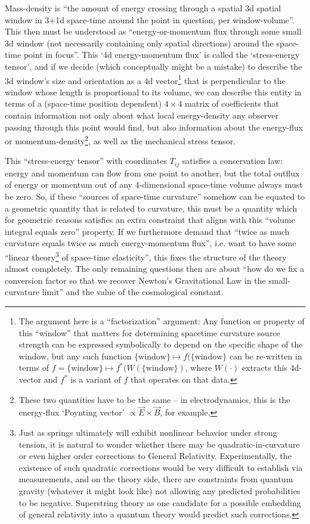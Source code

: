\documentclass[twocolumn]{article}
\begin{document}
Mass-density is ``the amount of energy crossing through a spatial 3d
spatial window in 3+1d space-time around the point in question, per
window-volume''. This then must be understood as ``energy-or-momentum
flux through some small 3d window (not necessarily containing only
spatial directions) around the space-time point in focus''. This `4d
energy-momentum flux' is called the `stress-energy tensor', and if we
decide (which conceptually might be a mistake) to describe the 3d
window's size and orientation as a 4d vector\footnote{The argument
here is a ``factorization'' argument: Any function or property of this
``window'' that matters for determining spacetime curvature source
strength can be expressed symbolically to depend on the specific shape
of the window, but any such function $\{\text{window}\}\mapsto
f(\{\text{window}\}$ can be re-written in terms of $f
= \{\text{window}\}\mapsto f^*(W(\{\text{window}\})$, where $W(\cdot)$
extracts this 4d-vector and $f^*$ is a variant of $f$ that operates on
that data.}
that is perpendicular to the window whose
length is proportional to its volume, we can describe this entity in
terms of a (space-time position dependent) $4\times 4$ matrix of
coefficients that contain information not only about what local
energy-density any observer passing through this point would find, but
also information about the energy-flux or
momentum-density\footnote{These two quantities have to be the same --
in electrodynamics, this is the energy-flux `Poynting vector'
$\propto \vec E\times\vec B$, for example.}, as well as the mechanical
stress tensor.

This ``stress-energy tensor'' with coordinates $T_{ij}$ satisfies a
conservation law: energy and momentum can flow from one point to
another, but the total outflux of energy or momentum out of any
4-dimensional space-time volume always must be zero. So, if these
``sources of space-time curvature'' somehow can be equated to a
geometric quantity that is related to curvature, this must be a
quantity which for geometric reasons satisfies an extra constraint
that aligns with this ``volume integral equals zero'' property. If we
furthermore demand that ``twice as much curvature equals twice as much
energy-momentum flux'', i.e. want to have some ``linear
theory\footnote{Just as springs ultimately will exhibit nonlinear
behavior under strong tension, it is natural to wonder whether there
may be quadratic-in-curvature or even higher order corrections to
General Relativity. Experimentally, the existence of such quadratic
corrections would be very difficult to establish via measurements, and
on the theory side, there are constraints from quantum gravity
(whatever it might look like) not allowing any predicted probabilities
to be negative. Superstring theory as one candidate for a possible
embedding of general relativity into a quantum theory would predict
such corrections.} of space-time elasticity'', this fixes the
structure of the theory almost completely. The only remaining
questions then are about ``how do we fix a conversion factor so that
we recover Newton's Gravitational Law in the small-curvature limit''
and the value of the cosmological constant.
\end{document}
